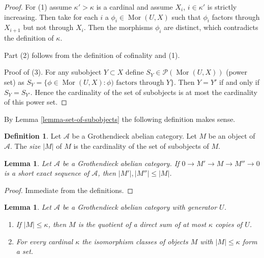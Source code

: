 \documentclass{stacks-project}
\theoremstyle{plain}
\newtheorem{lemma}[subsection]{Lemma}
\theoremstyle{definition}
\newtheorem{definition}[subsection]{Definition}
\theoremstyle{remark}
\numberwithin{equation}{subsection}
\def\Mor{\mathop{\mathrm{Mor}}\nolimits}
\begin{document}
\begin{proof}
For (1) assume $\kappa' > \kappa$ is a cardinal and assume
$X_i$, $i \in \kappa'$ is strictly increasing. Then take for
each $i$ a $\phi_i \in \Mor(U, X)$ such that $\phi_i$ factors through
$X_{i + 1}$ but not through $X_i$. Then the morphisms $\phi_i$
are distinct, which contradicts the definition of $\kappa$.

\medskip\noindent
Part (2) follows from the definition of cofinality and (1).

\medskip\noindent
Proof of (3). For any subobject $Y \subset X$
define $S_Y \in \mathcal{P}(\Mor(U, X))$ (power set) as
$S_Y = \{\phi \in \Mor(U,X) : \phi)\text{ factors through }Y\}$.
Then $Y = Y'$ if and only if $S_Y = S_{Y'}$. Hence the cardinality
of the set of subobjects is at most the cardinality of this power set.
\end{proof}

\noindent
By Lemma \ref{lemma-set-of-subobjects} the following definition makes sense.

\begin{definition}
\label{definition-size}
Let $\mathcal{A}$ be a Grothendieck abelian category.
Let $M$ be an object of $\mathcal{A}$.
The {\it size} $|M|$ of $M$ is the cardinality of the set of subobjects
of $M$.
\end{definition}

\begin{lemma}
\label{lemma-size-goes-down}
Let $\mathcal{A}$ be a Grothendieck abelian category.
If $0 \to M' \to M \to M'' \to 0$ is a short exact sequence of
$\mathcal{A}$, then $|M'|, |M''| \leq |M|$.
\end{lemma}

\begin{proof}
Immediate from the definitions.
\end{proof}

\begin{lemma}
\label{lemma-set-iso-classes-bounded-size}
Let $\mathcal{A}$ be a Grothendieck abelian category with generator $U$.
\begin{enumerate}
\item If $|M| \leq \kappa$, then $M$ is the quotient of a direct
sum of at most $\kappa$ copies of $U$.
\item For every cardinal $\kappa$ the isomorphism classes
of objects $M$ with $|M| \leq \kappa$ form a set.
\end{enumerate}
\end{lemma}
\end{document}
